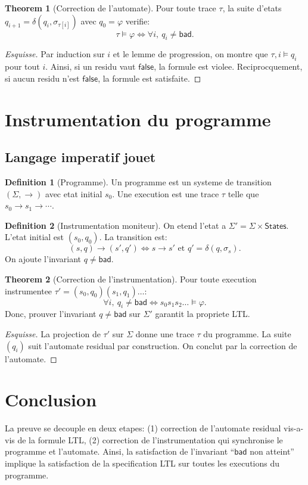 \documentclass[11pt]{article}
\newcommand{\eval}{\models}
\newcommand{\bad}{\mathsf{bad}}
\newcommand{\states}{\mathsf{States}}
\newcommand{\deltaa}{\delta}
\theoremstyle{definition}
\newtheorem{definition}{Definition}
\newtheorem{theorem}{Theorem}
\begin{document}
\begin{theorem}[Correction de l'automate]
Pour toute trace $\tau$, la suite d'etats $q_{i+1}=\deltaa(q_i,\sigma_{\tau[i]})$
avec $q_0=\varphi$ verifie:
\[
\tau \eval \varphi \iff \forall i,\ q_i \ne \bad.
\]
\end{theorem}
\begin{proof}[Esquisse]
Par induction sur $i$ et le lemme de progression, on montre que
$\tau,i \eval q_i$ pour tout $i$. Ainsi, si un residu vaut $\mathsf{false}$,
la formule est violee. Reciprocquement, si aucun residu n'est $\mathsf{false}$,
la formule est satisfaite.
\end{proof}

\section{Instrumentation du programme}

\subsection{Langage imperatif jouet}

\begin{definition}[Programme]
Un programme est un systeme de transition $(\Sigma,\rightarrow)$ avec etat initial
$s_0$. Une execution est une trace $\tau$ telle que $s_0 \rightarrow s_1 \rightarrow \cdots$.
\end{definition}

\begin{definition}[Instrumentation moniteur]
On etend l'etat a $\Sigma'=\Sigma \times \states$.
L'etat initial est $(s_0,q_0)$. La transition est:
\[
(s,q)\rightarrow (s',q') \iff s\rightarrow s' \text{ et } q'=\deltaa(q,\sigma_s).
\]
On ajoute l'invariant $q \ne \bad$.
\end{definition}

\begin{theorem}[Correction de l'instrumentation]
Pour toute execution instrumentee $\tau'=(s_0,q_0)(s_1,q_1)\ldots$:
\[
\forall i,\ q_i \ne \bad \iff s_0 s_1 s_2 \ldots \eval \varphi.
\]
Donc, prouver l'invariant $q \ne \bad$ sur $\Sigma'$ garantit la propriete LTL.
\end{theorem}
\begin{proof}[Esquisse]
La projection de $\tau'$ sur $\Sigma$ donne une trace $\tau$ du programme.
La suite $(q_i)$ suit l'automate residual par construction. On conclut par
la correction de l'automate.
\end{proof}

\section{Conclusion}

La preuve se decouple en deux etapes: (1) correction de l'automate residual vis-a-vis
de la formule LTL, (2) correction de l'instrumentation qui synchronise le programme
et l'automate. Ainsi, la satisfaction de l'invariant ``$\bad$ non atteint'' implique
la satisfaction de la specification LTL sur toutes les executions du programme.
\end{document}
